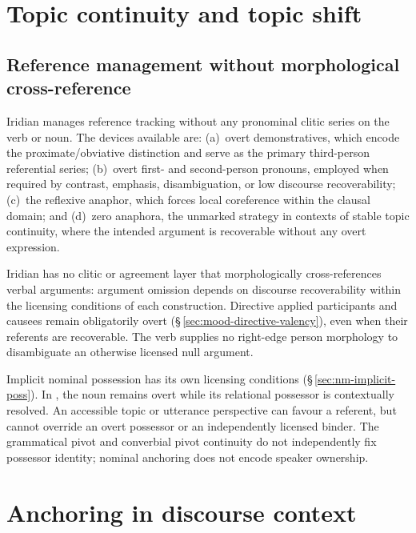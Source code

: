 \section{Topic continuity and topic shift}\label{sec:topic-continuity}


\subsection{Reference management without morphological cross-reference}
\label{sec:ref-management}

Iridian manages reference tracking without any pronominal clitic series on the
verb or noun. The devices available are: (a)~overt demonstratives, which encode
the proximate/obviative distinction and serve as the primary third-person
referential series; (b)~overt first- and second-person pronouns, employed when
required by contrast, emphasis, disambiguation, or low discourse recoverability;
(c)~the reflexive anaphor, which forces local coreference within the clausal
domain; and (d)~zero anaphora, the unmarked strategy in contexts of stable topic
continuity, where the intended argument is recoverable
without any overt expression.

Iridian has no clitic or agreement layer that morphologically
cross-references verbal arguments: argument omission depends on discourse
recoverability within the licensing conditions of each construction. Directive
applied participants and causees remain obligatorily overt
(§\,\ref{sec:mood-directive-valency}), even when their referents are
recoverable. The verb supplies no right-edge person morphology to
disambiguate an otherwise licensed null argument.

Implicit nominal possession has its own licensing conditions
(§\,\ref{sec:nm-implicit-poss}). In  ,
the noun remains overt while its relational possessor is contextually
resolved. An accessible topic or utterance perspective can favour a referent,
but cannot override an overt possessor or an independently licensed binder.
The grammatical pivot and converbial pivot continuity do not independently
fix possessor identity; nominal anchoring does not encode speaker ownership.

\section{Anchoring in discourse context}\label{sec:discourse-definiteness}


